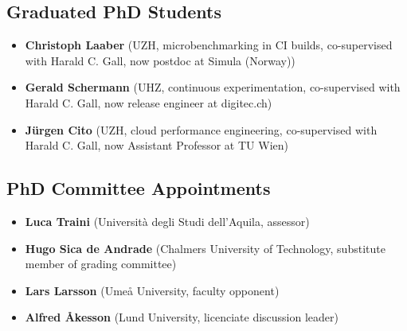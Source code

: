 \documentclass[paper=letter,fontsize=11pt]{scrartcl} %
\begin{document}
\subsection*{Graduated PhD Students}

\begin{itemize}
\item \textbf{Christoph Laaber} (UZH, microbenchmarking in CI builds, co-supervised with Harald C. Gall, now postdoc at Simula (Norway))
\item \textbf{Gerald Schermann} (UHZ, continuous experimentation, co-supervised with Harald C. Gall, now release engineer at digitec.ch)
\item \textbf{J\"urgen Cito} (UZH, cloud performance engineering, co-supervised with Harald C. Gall, now Assistant Professor at TU Wien)
\end{itemize}

\subsection*{PhD Committee Appointments}

\begin{itemize}
\item \textbf{Luca Traini} (Università degli Studi dell'Aquila, assessor) 
\item \textbf{Hugo Sica de Andrade} (Chalmers University of Technology, substitute member of grading committee) 
\item \textbf{Lars Larsson} (Umeå University, faculty opponent)
\item \textbf{Alfred Åkesson} (Lund University, licenciate discussion leader)
\end{itemize}
\end{document}
